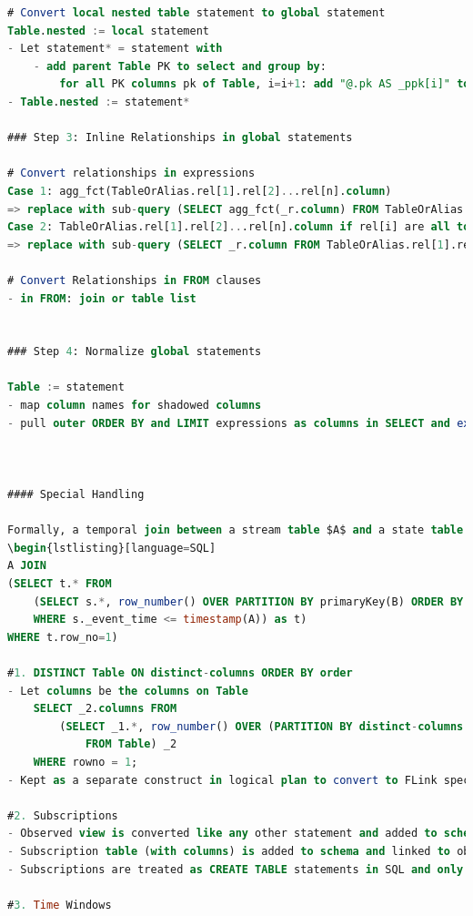 \documentclass[	DIV=calc,%
							paper=letter,%
							fontsize=11pt,%
							twocolumn]{scrartcl}	 					%
\begin{document}
\begin{lstlisting}[language=SQL]
# Convert local nested table statement to global statement
Table.nested := local statement
- Let statement* = statement with
    - add parent Table PK to select and group by:
        for all PK columns pk of Table, i=i+1: add "@.pk AS _ppk[i]" to SELECT and "@.pk" to GROUP BY
- Table.nested := statement*

### Step 3: Inline Relationships in global statements

# Convert relationships in expressions
Case 1: agg_fct(TableOrAlias.rel[1].rel[2]...rel[n].column)
=> replace with sub-query (SELECT agg_fct(_r.column) FROM TableOrAlias.rel[1].rel[2]...rel[n] AS _r)
Case 2: TableOrAlias.rel[1].rel[2]...rel[n].column if rel[i] are all to-0/1 relationships
=> replace with sub-query (SELECT _r.column FROM TableOrAlias.rel[1].rel[2]...rel[n] AS _r)

# Convert Relationships in FROM clauses
- in FROM: join or table list


### Step 4: Normalize global statements

Table := statement
- map column names for shadowed columns
- pull outer ORDER BY and LIMIT expressions as columns in SELECT and extract as meta data for Table in schema



#### Special Handling

Formally, a temporal join between a stream table $A$ and a state table $B$ is defined as:
\begin{lstlisting}[language=SQL]
A JOIN
(SELECT t.* FROM
	(SELECT s.*, row_number() OVER PARTITION BY primaryKey(B) ORDER BY s._event_time DESC AS row_no FROM (SUBSCRIBE ON CHANGE TO B) as s
	WHERE s._event_time <= timestamp(A)) as t)
WHERE t.row_no=1)

#1. DISTINCT Table ON distinct-columns ORDER BY order
- Let columns be the columns on Table
    SELECT _2.columns FROM
        (SELECT _1.*, row_number() OVER (PARTITION BY distinct-columns ORDER BY order) AS rowno
            FROM Table) _2
    WHERE rowno = 1;
- Kept as a separate construct in logical plan to convert to FLink special handlign

#2. Subscriptions
- Observed view is converted like any other statement and added to schema and logical plans
- Subscription table (with columns) is added to schema and linked to observed view with observation type (ADD, DELETE, UPDATE)
- Subscriptions are treated as CREATE TABLE statements in SQL and only materialized in flink by producing a change-stream

#3. Time Windows


\end{lstlisting}
\end{document}
